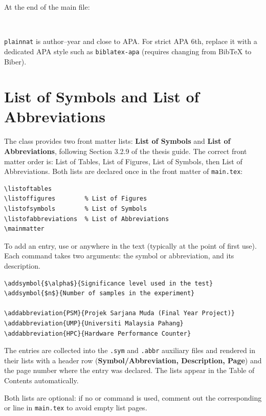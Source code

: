 At the end of the main file:

\begin{verbatim}


\end{verbatim}

\texttt{plainnat} is author--year and close to APA. For strict APA 6th, replace it with a dedicated APA style such as \texttt{biblatex-apa} (requires changing from BibTeX to Biber).

\section{List of Symbols and List of Abbreviations}

The class provides two front matter lists: \textbf{List of Symbols} and \textbf{List of Abbreviations}, following Section 3.2.9 of the thesis guide. The correct front matter order is: List of Tables, List of Figures, List of Symbols, then List of Abbreviations. Both lists are declared once in the front matter of \texttt{main.tex}:

\begin{verbatim}
\listoftables
\listoffigures        % List of Figures
\listofsymbols        % List of Symbols
\listofabbreviations  % List of Abbreviations
\mainmatter
\end{verbatim}

To add an entry, use \texttt{\string\addsymbol} or \texttt{\string\addabbreviation} anywhere in the text (typically at the point of first use). Each command takes two arguments: the symbol or abbreviation, and its description.

\begin{verbatim}
\addsymbol{$\alpha$}{Significance level used in the test}
\addsymbol{$n$}{Number of samples in the experiment}

\addabbreviation{PSM}{Projek Sarjana Muda (Final Year Project)}
\addabbreviation{UMP}{Universiti Malaysia Pahang}
\addabbreviation{HPC}{Hardware Performance Counter}
\end{verbatim}

The entries are collected into the \texttt{.sym} and \texttt{.abbr} auxiliary files and rendered in their lists with a header row (\textbf{Symbol/Abbreviation, Description, Page}) and the page number where the entry was declared. The lists appear in the Table of Contents automatically.

Both lists are optional: if no \texttt{\string\addsymbol} or \texttt{\string\addabbreviation} command is used, comment out the corresponding \texttt{\string\listofsymbols} or \texttt{\string\listofabbreviations} line in \texttt{main.tex} to avoid empty list pages.

